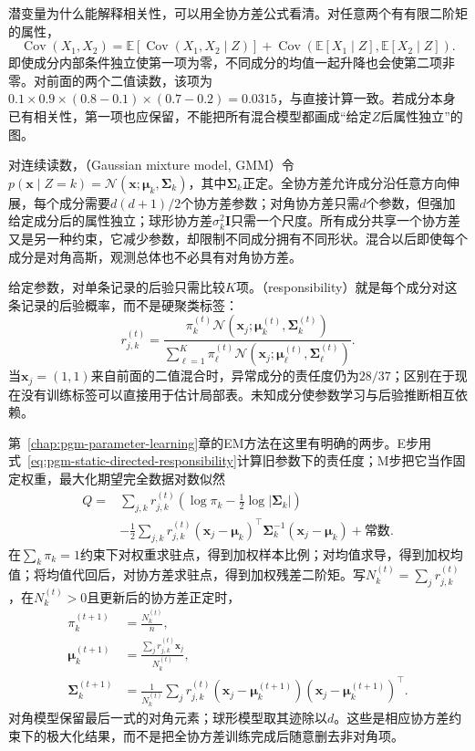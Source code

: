 潜变量为什么能解释相关性，可以用全协方差公式看清。对任意两个有有限二阶矩的属性，
\[
  \operatorname{Cov}(X_1,X_2)=
  \mathbb{E}\!\left[\operatorname{Cov}(X_1,X_2\mid Z)\right]
  +\operatorname{Cov}\!\left(
       \mathbb{E}[X_1\mid Z],\mathbb{E}[X_2\mid Z]\right).
\]
即使成分内部条件独立使第一项为零，不同成分的均值一起升降也会使第二项非零。对前面的两个二值读数，该项为$0.1\times0.9\times(0.8-0.1)\times(0.7-0.2)=0.0315$，与直接计算一致。若成分本身已有相关性，第一项也应保留，不能把所有混合模型都画成“给定$Z$后属性独立”的图。

对连续读数，（Gaussian mixture model, GMM）令$p(\bm{x}\mid Z=k)=\mathcal{N}(\bm{x};\bm{\mu}_k,\bm{\Sigma}_k)$，其中$\bm{\Sigma}_k$正定。全协方差允许成分沿任意方向伸展，每个成分需要$d(d+1)/2$个协方差参数；对角协方差只需$d$个参数，但强加给定成分后的属性独立；球形协方差$\sigma_k^2\bm{I}$只需一个尺度。所有成分共享一个协方差又是另一种约束，它减少参数，却限制不同成分拥有不同形状。混合以后即使每个成分是对角高斯，观测总体也不必具有对角协方差。

给定参数，对单条记录的后验只需比较$K$项。（responsibility）就是每个成分对这条记录的后验概率，而不是硬聚类标签：
\begin{equation}
  \label{eq:pgm-static-directed-responsibility}
  r_{j,k}^{(t)}=
  \frac{\pi_k^{(t)}
      \mathcal{N}(\bm{x}_j;\bm{\mu}_k^{(t)},\bm{\Sigma}_k^{(t)})}
       {\sum_{\ell=1}^{K}\pi_\ell^{(t)}
      \mathcal{N}(\bm{x}_j;\bm{\mu}_\ell^{(t)},\bm{\Sigma}_\ell^{(t)})}.
\end{equation}
当$\bm{x}_j=(1,1)$来自前面的二值混合时，异常成分的责任度仍为$28/37$；区别在于现在没有训练标签可以直接用于估计局部表。未知成分使参数学习与后验推断相互依赖。

第~\ref{chap:pgm-parameter-learning}章的EM方法在这里有明确的两步。E步用式~\eqref{eq:pgm-static-directed-responsibility}计算旧参数下的责任度；M步把它当作固定权重，最大化期望完全数据对数似然
\[
  \begin{aligned}
    Q={}&\sum_{j,k}r_{j,k}^{(t)}
       \left(\log\pi_k-\frac12\log|\bm{\Sigma}_k|\right)\\
       &-\frac12\sum_{j,k}r_{j,k}^{(t)}
         (\bm{x}_j-\bm{\mu}_k)^\top
          \bm{\Sigma}_k^{-1}(\bm{x}_j-\bm{\mu}_k)
       +\text{常数}.
  \end{aligned}
\]
在$\sum_k\pi_k=1$约束下对权重求驻点，得到加权样本比例；对均值求导，得到加权均值；将均值代回后，对协方差求驻点，得到加权残差二阶矩。写$N_k^{(t)}=\sum_jr_{j,k}^{(t)}$，在$N_k^{(t)}>0$且更新后的协方差正定时，
\begin{equation}
  \label{eq:pgm-static-directed-gmm-em}
  \begin{aligned}
    \pi_k^{(t+1)}&=\frac{N_k^{(t)}}{n},\\
    \bm{\mu}_k^{(t+1)}
      &=\frac{\sum_jr_{j,k}^{(t)}\bm{x}_j}{N_k^{(t)}},\\
    \bm{\Sigma}_k^{(t+1)}
      &=\frac{1}{N_k^{(t)}}\sum_jr_{j,k}^{(t)}
       (\bm{x}_j-\bm{\mu}_k^{(t+1)})
       (\bm{x}_j-\bm{\mu}_k^{(t+1)})^\top.
  \end{aligned}
\end{equation}
对角模型保留最后一式的对角元素；球形模型取其迹除以$d$。这些是相应协方差约束下的极大化结果，而不是把全协方差训练完成后随意删去非对角项。

